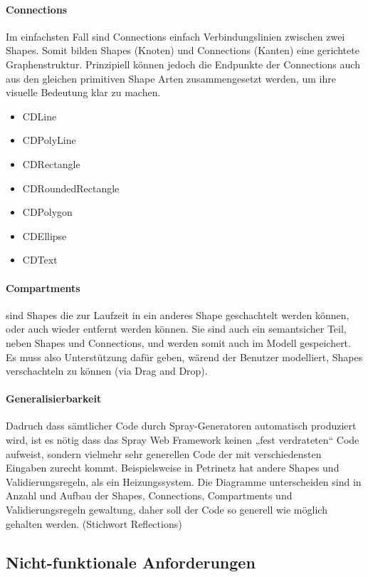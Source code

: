 \paragraph{Connections}

Im einfachsten Fall sind Connections einfach Verbindungslinien zwischen
zwei Shapes. Somit bilden Shapes (Knoten) und Connections (Kanten)
eine gerichtete Graphenstruktur.
Prinzipiell können jedoch die Endpunkte der Connections auch aus den gleichen
primitiven Shape Arten zusammengesetzt werden, um ihre visuelle Bedeutung
klar zu machen.

\begin{itemize}
  \item CDLine
  \item CDPolyLine
  \item CDRectangle
  \item CDRoundedRectangle
  \item CDPolygon
  \item CDEllipse
  \item CDText
\end{itemize}

\paragraph{Compartments}
sind Shapes die zur Laufzeit in ein anderes Shape geschachtelt werden können,
oder auch wieder entfernt werden können. Sie sind auch ein semantsicher Teil,
neben Shapes und Connections, und werden somit auch im Modell gespeichert.
Es muss also Unterstützung dafür geben, wärend der Benutzer modelliert, Shapes
verschachteln zu können (via Drag and Drop).


\paragraph{Generalisierbarkeit}
Dadruch dass sämtlicher Code durch Spray-Generatoren automatisch produziert wird,
ist es nötig dass das Spray Web Framework keinen „fest verdrateten“ Code
aufweist, sondern vielmehr sehr generellen Code der mit verschiedensten
Eingaben zurecht kommt.
Beispielsweise in Petrinetz hat andere Shapes und Validierungsregeln,
als ein Heizungssystem. Die Diagramme unterscheiden sind in Anzahl und
Aufbau der Shapes, Connections, Compartments und Validierungsregeln
gewaltung, daher soll der Code so generell wie möglich gehalten werden.
(Stichwort Reflections)

\subsection{Nicht-funktionale Anforderungen}

